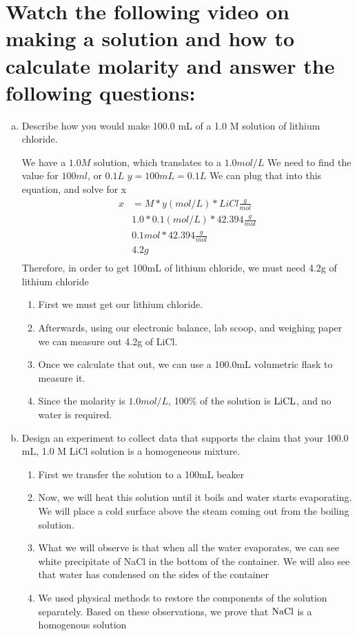 \documentclass[11pt]{article}
\begin{document}
\section{Watch the following video on making a solution and how to calculate molarity and answer the following questions:}
\label{sec:org23c5c75}
\begin{enumerate}[(a)]
\item Describe how you would make 100.0 mL of a 1.0 M solution of lithium chloride.

We have a \(1.0M\) solution, which translates to  a \(1.0mol/L\)
We need to find the value for \(100ml\), or \(0.1L\)
\(y = 100mL = 0.1L\)
We can plug that into this equation, and solve for x
\begin{align*}
x&= M * y(mol/L) * LiCl\frac{g}{mol}\\
&1.0 * 0.1(mol/L) * 42.394\frac{g}{mol}\\
&0.1mol * 42.394\frac{g}{mol}\\
&4.2g\\
\end{align*}
 Therefore, in order to get 100mL of lithium chloride, we must need 4.2g of
lithium chloride
\begin{enumerate}[1]
\item First we must get our lithium chloride.
\item Afterwards, using our electronic balance, lab scoop, and weighing paper we can measure out 4.2g of LiCl.
\item Once we calculate that out, we can use a 100.0mL volumetric flask to measure it.
\item Since the molarity is \(1.0mol/L\), 100\% of the solution is \(\ce{LiCL}\), and no
water is required.
\end{enumerate}

\item Design an experiment to collect data that supports the claim that your 100.0
mL, 1.0 M LiCl solution is a homogeneous mixture.
\begin{enumerate}[1]
\item First we transfer the solution to a 100mL beaker
\item Now, we will heat this solution until it boils and water starts
evaporating. We will place a cold surface above the steam coming out from
the boiling solution.
\item What we will observe is that when all the water evaporates, we can see
white precipitate of NaCl in the bottom of the container. We will also
see that water has condensed on the sides of the container
\item We used physical methods to restore the components of the solution
separately. Based on these observations, we prove that \(\ce{NaCl}\) is a
homogenous solution
\end{enumerate}
\end{enumerate}
\end{document}
